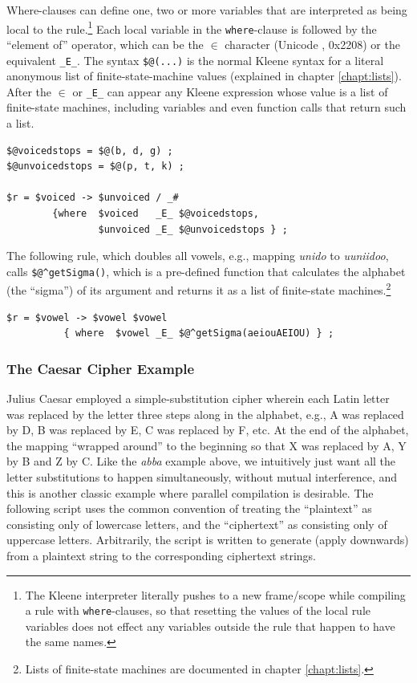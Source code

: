 Where-clauses can define one, two or more variables that are interpreted as being
local to the rule.\footnote{The Kleene interpreter literally pushes to a new
	frame/scope while compiling a rule with \texttt{where}-clauses, so that resetting the
values of the local rule variables does not effect any variables outside the rule
that happen to have the same names.}  Each local variable in the \texttt{where}-clause is
followed by the ``element of'' operator, which can be the $\in$ character
(Unicode , 0x2208) or the  equivalent \verb!_E_!.  The
syntax \verb!$@(...)! is the normal Kleene syntax for a literal anonymous list of
finite-state-machine values (explained in chapter \ref{chapt:lists}).  After the $\in$ or \verb!_E_! can appear any Kleene
expression whose value is a list of finite-state machines, including variables
and even function calls that return such a list.

\begin{samepage}
\begin{Verbatim}
$@voicedstops = $@(b, d, g) ;
$@unvoicedstops = $@(p, t, k) ;

$r = $voiced -> $unvoiced / _#  
        {where  $voiced   _E_ $@voicedstops, 
                $unvoiced _E_ $@unvoicedstops } ;
\end{Verbatim}
\end{samepage}

\noindent
The following rule, which doubles all vowels, e.g., mapping \emph{unido} to
\emph{uuniidoo}, calls \verb!$@^getSigma()!, which is a pre-defined function that
calculates the alphabet (the ``sigma'') of its \fsm{}
argument and returns it as a list of finite-state
machines.\footnote{Lists of finite-state machines are documented in
chapter \ref{chapt:lists}.}

\begin{Verbatim}
$r = $vowel -> $vowel $vowel 
          { where  $vowel _E_ $@^getSigma(aeiouAEIOU) } ;
\end{Verbatim}

\subsubsection{The Caesar Cipher Example}

Julius Caesar employed a simple-substitution cipher wherein each Latin
letter was replaced by the letter three steps along
in the alphabet, e.g., A was replaced by D, B was replaced by E, C was replaced by F, etc.  At the end of the alphabet,
the mapping ``wrapped around'' to the beginning so that X was replaced
by A, Y by B and Z by C.  Like the \emph{abba} example
above, we intuitively just want all the letter substitutions to happen simultaneously, without mutual interference, and
this is another classic example where parallel compilation is desirable.  The following script uses the common convention
of treating the ``plaintext'' as consisting only of lowercase letters, and the ``ciphertext'' as consisting only of uppercase
letters.  Arbitrarily, the script is written to generate (apply downwards) from a plaintext string to the
corresponding ciphertext strings.


